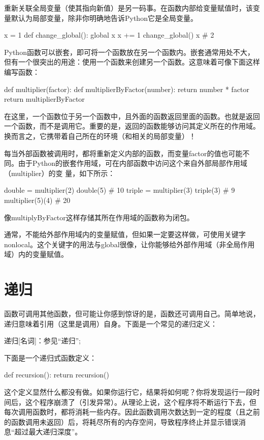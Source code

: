 重新关联全局变量（使其指向新值）是另一码事。在函数内部给变量赋值时，该变量默认为局部变量，除非你明确地告诉Python它是全局变量。
\begin{pyc}
x = 1
def change_global():
    global x
    x += 1
change_global()
x  # 2
\end{pyc}

\begin{tcolorbox}[title=作用域嵌套]
Python函数可以嵌套，即可将一个函数放在另一个函数内。嵌套通常用处不大，但有一个很突出的用途：使用一个函数来创建另一个函数。这意味着可像下面这样编写函数：
\begin{pyc}
def multiplier(factor):
    def multiplierByFactor(number):
        return number * factor
    return multiplierByFactor
\end{pyc}
在这里，一个函数位于另一个函数中，且外面的函数返回里面的函数。也就是返回一个函数，而不是调用它。重要的是，返回的函数能够访问其定义所在的作用域。换而言之，它携带着自己所在的环境（和相关的局部变量）！

每当外部函数被调用时，都将重新定义内部的函数，而变量factor的值也可能不同。由于Python的嵌套作用域，可在内部函数中访问这个来自外部局部作用域（multiplier）的变
量，如下所示：
\begin{pyc}
double = multiplier(2)
double(5)  # 10
triple = multiplier(3)
triple(3)  # 9
multiplier(5)(4)  # 20
\end{pyc}

像multiplyByFactor这样存储其所在作用域的函数称为闭包。

通常，不能给外部作用域内的变量赋值，但如果一定要这样做，可使用关键字nonlocal。这个关键字的用法与global很像，让你能够给外部作用域（非全局作用域）内的变量赋值。
\end{tcolorbox}
\section{递归}
函数可调用其他函数，但可能让你感到惊讶的是，函数还可调用自己。简单地说，递归意味着引用（这里是调用）自身。下面是一个常见的递归定义：

递归[名词]：参见``递归'';

下面是一个递归式函数定义：
\begin{pyc}
def recursion():
    return recursion()
\end{pyc}
这个定义显然什么都没有做。如果你运行它，结果将如何呢？你将发现运行一段时间后，这个程序崩溃了（引发异常）。从理论上说，这个程序将不断运行下去，但每次调用函数时，都将消耗一些内存。因此函数调用次数达到一定的程度（且之前的函数调用未返回）后，将耗尽所有的内存空间，导致程序终止并显示错误消息“超过最大递归深度”。

